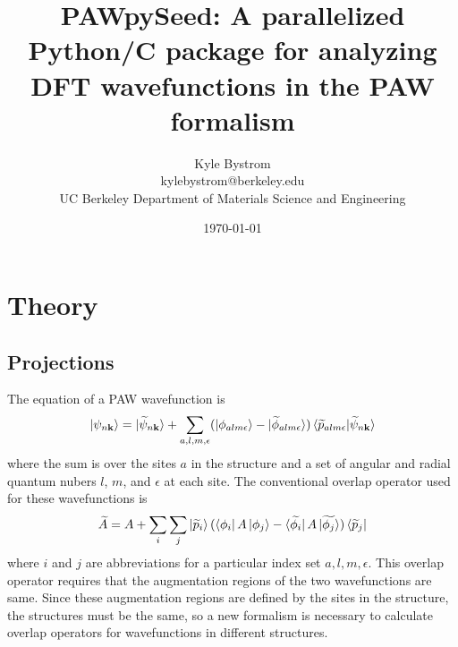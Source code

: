 \documentclass[12pt]{article}
\begin{document}
\newcommand{\ind}{lm\epsilon}

\title{PAWpySeed: A parallelized Python/C package for analyzing
DFT wavefunctions in the PAW formalism}
\author{Kyle Bystrom\\
        kylebystrom@berkeley.edu\\
		UC Berkeley Department of Materials Science and Engineering}
\date{\today}
\maketitle
{}

\section{Theory}


\subsection{Projections}

The equation of a PAW wavefunction is\cite{blochl}
\begin{equation}
\ket{\psi_{n\mathbf{k}}}=\ket{\widetilde{\psi}_{n\mathbf{k}}}+
\sum_{a,l,m,\epsilon}(\ket{\phi_{a\ind}}-\ket{\widetilde{\phi}_{a\ind}})
\braket{\widetilde{p}_{a\ind}|\widetilde{\psi}_{n\mathbf{k}}}
\label{eq:1}
\end{equation}
where the sum is over the sites $a$ in the structure and a set of
angular and radial quantum nubers $l$, $m$, and $\epsilon$ at each site.
The conventional overlap operator used for these wavefunctions is
\begin{equation}
\widetilde{A}=A+\sum_i\sum_j\ket{\widetilde{p}_i}(\bra{\phi_i}A\ket{\phi_j}
-\bra{\widetilde{\phi_i}}A\ket{\widetilde{\phi_j}})\bra{\widetilde{p}_j}
\label{eq:loc}
\end{equation}
where $i$ and $j$ are abbreviations for a particular index set
$a,l,m,\epsilon$. This overlap operator requires that the augmentation
regions of the two wavefunctions are same. Since these augmentation regions
are defined by the sites in the structure, the structures must be the same,
so a new formalism is necessary to calculate overlap operators for wavefunctions
in different structures.
\end{document}
